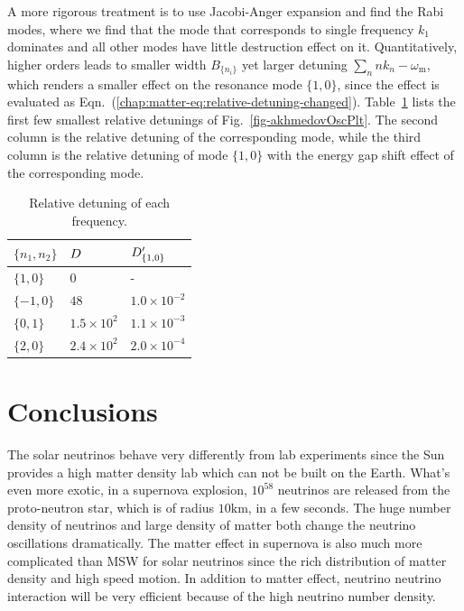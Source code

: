 A more rigorous treatment is to use Jacobi-Anger expansion and find the Rabi modes, where we find that the mode that corresponds to single frequency $k_1$ dominates and all other modes have little destruction effect on it. Quantitatively, higher orders leads to smaller width $B_{\{n_i\}}$ yet larger detuning $\sum_{n} nk_n-\omega_{\mathrm m}$, which renders a smaller effect on the resonance mode $\{1,0\}$, since the effect is evaluated as Eqn.~(\ref{chap:matter-eq:relative-detuning-changed}).
Table~\ref{tab-q-values-each-mode} lists the first few smallest relative detunings of Fig.~\ref{fig-akhmedovOscPlt}. The second column is the relative detuning of the corresponding mode, while the third column is the relative detuning of mode $\{1,0\}$ with the energy gap shift effect of the corresponding mode.




\begin{table}
\centering

\begin{tabular}{lll}
\hline
 $\{n_1,n_2\}$ &  $D$ & $D'_{\{1,0\}}$   \\
\hline
 $\{1,0\}$ & $0$ &  - \\
 $\{-1,0\}$ & $48$ &  $1.0\times 10^{-2}$ \\
 $\{0,1\}$ & $1.5\times 10^2$ &  $1.1\times 10^{-3}$  \\
 $\{2,0\}$ & $2.4\times 10^{2}$ & $2.0\times 10^{-4}$ \\
 \hline
\end{tabular}
\caption{\label{tab-q-values-each-mode}Relative detuning of each frequency.}
\end{table}






\section{\label{conclusions}Conclusions}



The solar neutrinos behave very differently from lab experiments since the Sun provides a high matter density lab which can not be built on the Earth. What's even more exotic, in a supernova explosion, $10^{58}$ neutrinos are released from the proto-neutron star, which is of radius $10\mathrm{km}$, in a few seconds. The huge number density of neutrinos and large density of matter both change the neutrino oscillations dramatically. The matter effect in supernova is also much more complicated than MSW for solar neutrinos since the rich distribution of matter density and high speed motion. In addition to matter effect, neutrino neutrino interaction will be very efficient because of the high neutrino number density.

